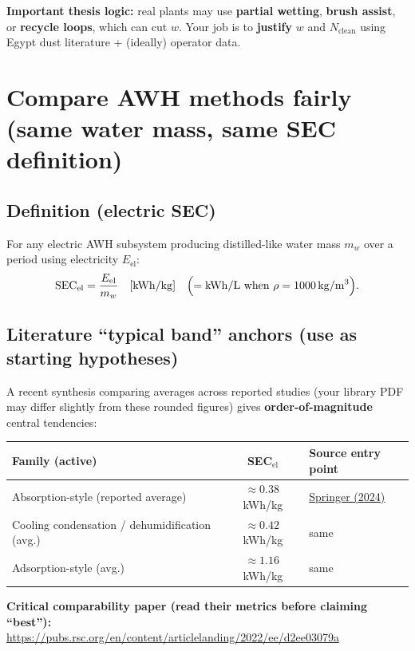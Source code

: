\documentclass[11pt,a4paper]{article}
\begin{document}
\textbf{Important thesis logic:} real plants may use \textbf{partial wetting}, \textbf{brush assist}, or \textbf{recycle loops}, which can cut $w$. Your job is to \textbf{justify} $w$ and $N_{\mathrm{clean}}$ using Egypt dust literature + (ideally) operator data.

\section{Compare AWH methods fairly (same water mass, same SEC definition)}
\subsection{Definition (electric SEC)}
For any electric AWH subsystem producing distilled-like water mass $m_w$ over a period using electricity $E_{\mathrm{el}}$:
\begin{equation}
\mathrm{SEC}_{\mathrm{el}}=\frac{E_{\mathrm{el}}}{m_w}\quad[\mathrm{kWh/kg}]
\quad\Bigl(=\mathrm{kWh/L}\text{ when }\rho=1000\,\mathrm{kg/m^3}\Bigr).
\end{equation}

\subsection{Literature ``typical band'' anchors (use as starting hypotheses)}
A recent synthesis comparing averages across reported studies (your library PDF may differ slightly from these rounded figures) gives \textbf{order-of-magnitude} central tendencies:
\begin{center}
\small
\begin{tabular}{@{}p{4.6cm}cp{4.8cm}@{}}
\toprule
\textbf{Family (active)} & \textbf{SEC$_{\mathrm{el}}$} & \textbf{Source entry point} \\
\midrule
Absorption-style (reported average) & $\approx 0.38$\,kWh/kg &
\href{https://link.springer.com/article/10.1007/s42452-024-05746-z}{Springer (2024)}\\
Cooling condensation / dehumidification (avg.) & $\approx 0.42$\,kWh/kg & same \\
Adsorption-style (avg.) & $\approx 1.16$\,kWh/kg & same \\
\bottomrule
\end{tabular}
\end{center}
\normalsize
\noindent
\textbf{Critical comparability paper (read their metrics before claiming ``best''):}\\
\url{https://pubs.rsc.org/en/content/articlelanding/2022/ee/d2ee03079a}
\end{document}
